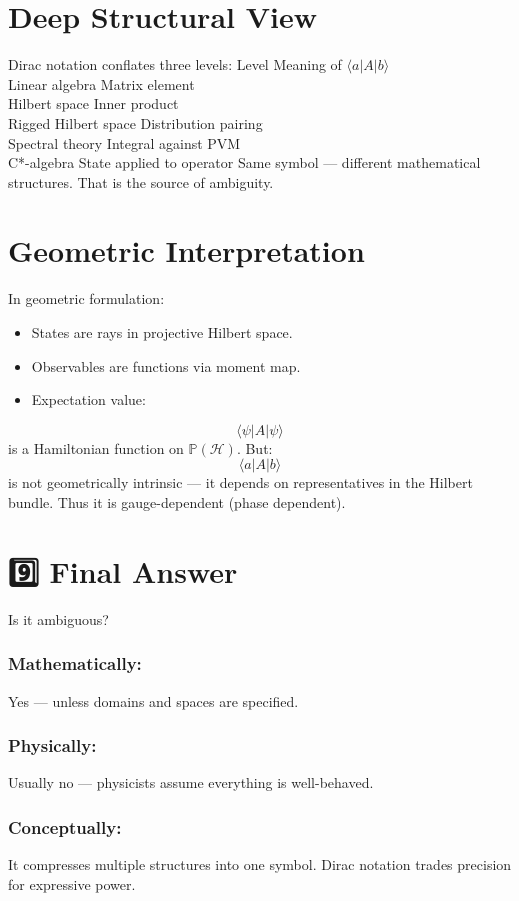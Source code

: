 \section{ Deep Structural View}\label{deep-structural-view}
Dirac notation conflates three levels:
\textbar{} Level \textbar{} Meaning of \(\langle a|A|b\rangle\)
\textbar{}\\
\textbar{} Linear algebra \textbar{} Matrix element \textbar{}\\
\textbar{} Hilbert space \textbar{} Inner product \textbar{}\\
\textbar{} Rigged Hilbert space \textbar{} Distribution pairing
\textbar{}\\
\textbar{} Spectral theory \textbar{} Integral against PVM \textbar{}\\
\textbar{} C*-algebra \textbar{} State applied to operator \textbar{}
Same symbol --- different mathematical structures.
That is the source of ambiguity.
\section{ Geometric Interpretation}\label{geometric-interpretation}
In geometric formulation:
\begin{itemize}
\item
  States are rays in projective Hilbert space.
\item
  Observables are functions via moment map.
\item
  Expectation value:
\end{itemize}
\[\langle \psi|A|\psi\rangle\]
is a Hamiltonian function on \(\mathbb P(\mathcal H)\).
But:
\[\langle a|A|b\rangle\]
is not geometrically intrinsic --- it depends on representatives in the
Hilbert bundle.
Thus it is gauge-dependent (phase dependent).
\section{9️⃣ Final Answer}\label{final-answer}
Is it ambiguous?
\subsubsection{Mathematically:}\label{mathematically}
Yes --- unless domains and spaces are specified.
\subsubsection{Physically:}\label{physically}
Usually no --- physicists assume everything is well-behaved.
\subsubsection{Conceptually:}\label{conceptually}
It compresses multiple structures into one symbol.
Dirac notation trades precision for expressive power.
